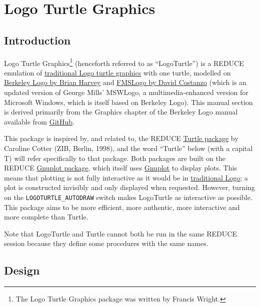 \section{Logo Turtle Graphics}


\subsection{Introduction}

Logo Turtle Graphics\footnote{The Logo Turtle Graphics package was
written by Francis Wright.} (henceforth referred to as ``LogoTurtle'')
is a REDUCE emulation of
\href{https://en.wikipedia.org/wiki/Turtle_graphics}{traditional Logo
  turtle graphics} with one turtle, modelled on
\href{http://people.eecs.berkeley.edu/~bh/logo.html}{Berkeley Logo by
  Brian Harvey} and \href{https://fmslogo.sourceforge.io/}{FMSLogo by
  David Costanzo} (which is an updated version of George Mills'
MSWLogo, a multimedia-enhanced version for Microsoft Windows, which is
itself based on Berkeley Logo).  This manual section is derived
primarily from the Graphics chapter of the Berkeley Logo manual
available from
\href{https://github.com/jrincayc/ucblogo-code}{GitHub}.

This package is inspired by, and related to, the REDUCE
\hyperref[package:TURTLE]{Turtle package} by Caroline Cotter (ZIB,
Berlin, 1998), and the word ``Turtle'' below (with a capital T) will
refer specifically to that package.  Both packages are built on the
REDUCE \hyperref[package:GNUPLOT]{Gnuplot package}, which itself uses
\href{http://gnuplot.info/}{Gnuplot} to display plots.  This means
that plotting is not fully interactive as it would be in
\href{https://en.wikipedia.org/wiki/Logo_(programming_language)}{traditional
  Logo}; a plot is constructed invisibly and only displayed when
requested.  However, turning on the \texttt{LOGOTURTLE\_AUTODRAW}
switch makes LogoTurtle as interactive as possible.  This package aims
to be more efficient, more authentic, more interactive and more
complete than Turtle.

Note that LogoTurtle and Turtle cannot both be run in the same REDUCE
session because they define some procedures with the same names.


\subsection{Design}

